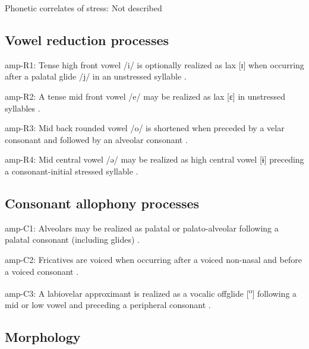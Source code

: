 {\begin{appendixdesc}
\item[Phonetic correlates of stress:] Not described
\end{appendixdesc}
\subsection*{Vowel reduction processes}
\begin{appendixdesc}

\item[amp-R1:] Tense high front vowel /i/ is optionally realized as lax [ɪ] when occurring after a palatal glide /j/ in an unstressed syllable \citep[37]{Bruce1984}.

\item[amp-R2:] A tense mid front vowel /e/ may be realized as lax [ɛ] in unstressed syllables \citep[38]{Bruce1984}.

\item[amp-R3:] Mid back rounded vowel /o/ is shortened when preceded by a velar consonant and followed by an alveolar consonant \citep[39]{Bruce1984}.

\item[amp-R4:] Mid central vowel /ə/ may be realized as high central vowel [ɨ] preceding a consonant-initial stressed syllable \citep[41]{Bruce1984}.
\end{appendixdesc}
\subsection*{Consonant allophony processes}
\begin{appendixdesc}

\item[amp-C1:] Alveolars may be realized as palatal or palato-alveolar following a palatal consonant (including glides) \citep[29]{Bruce1984}.

\item[amp-C2:] Fricatives are voiced when occurring after a voiced non-nasal and before a voiced consonant \citep[25]{Bruce1984}.

\item[amp-C3:] A labiovelar approximant is realized as a vocalic offglide [\textsuperscript{o}] following a mid or low vowel and preceding a peripheral consonant \citep[28]{Bruce1984}.
\end{appendixdesc}
\subsection*{Morphology}

}
